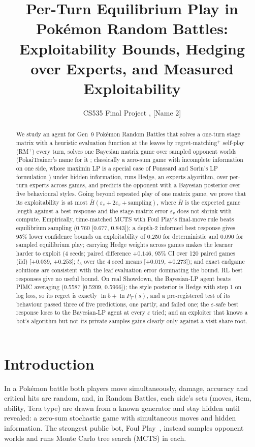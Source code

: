 \documentclass[10pt]{article}
\title{\vspace{-2.4em}\textbf{Per-Turn Equilibrium Play in Pok\'emon Random Battles:\\Exploitability Bounds, Hedging over Experts, and Measured Exploitability}\vspace{-0.8em}}
\author{CS535 Final Project \quad [Name 1], [Name 2]}
\date{\vspace{-1.6em}}
\theoremstyle{plain}
\theoremstyle{definition}
\theoremstyle{remark}
\newcommand{\Hbar}{\bar H}
\newcommand{\epss}{\varepsilon_s}
\newcommand{\epsv}{\varepsilon_v}
\begin{document}
\maketitle

\begin{abstract}
\noindent
We study an agent for Gen~9 Pok\'emon Random Battles that solves a one-turn stage matrix with a heuristic evaluation function at the leaves by regret-matching$^+$ self-play (RM$^+$) every turn, solves one Bayesian matrix game over sampled opponent worlds (PokaiTrainer's name for it \cite{Yu26}; classically a zero-sum game with incomplete information on one side, whose maximin LP is a special case of Ponssard and Sorin's LP formulation \cite{PS80}) under hidden information, runs Hedge, an experts algorithm, over per-turn experts across games, and predicts the opponent with a Bayesian posterior over five behavioural styles. Going beyond repeated play of one matrix game, we prove that its exploitability is at most $\Hbar(\epss+2\epsv+\text{sampling})$, where $\Hbar$ is the expected game length against a best response and the stage-matrix error $\epsv$ does not shrink with compute. Empirically, time-matched MCTS with Foul Play's final-move rule beats equilibrium sampling (0.760 [0.677, 0.843]); a depth-2 informed best response gives 95\% lower confidence bounds on exploitability of 0.250 for deterministic and 0.090 for sampled equilibrium play; carrying Hedge weights across games makes the learner harder to exploit (4 seeds; paired difference $+0.146$, 95\% CI over 120 paired games (iid) [$+0.039$, $+0.253$]; $t_3$ over the 4 seed means [$+0.019$, $+0.273$]); and exact endgame solutions are consistent with the leaf evaluation error dominating the bound. RL best responses give no useful bound. On real Showdown, the Bayesian-LP agent beats PIMC averaging (0.5587 [0.5209, 0.5966]); the style posterior is Hedge with step 1 on log loss, so its regret is exactly $\ln5+\ln P_T(s)$, and a pre-registered test of its behaviour passed three of five predictions, one partly, and failed one; the $\varepsilon$-safe best response loses to the Bayesian-LP agent at every $\varepsilon$ tried; and an exploiter that knows a bot's algorithm but not its private samples gains clearly only against a visit-share root.
\end{abstract}

\section{Introduction}
\label{sec:intro}
In a Pok\'emon battle both players move simultaneously, damage, accuracy and critical hits are random, and, in Random Battles, each side's sets (moves, item, ability, Tera type) are drawn from a known generator and stay hidden until revealed: a zero-sum stochastic game with simultaneous moves and hidden information. The strongest public bot, Foul Play~\cite{foulplay}, instead samples opponent worlds and runs Monte Carlo tree search (MCTS) in each.
\end{document}

